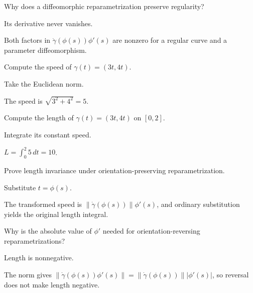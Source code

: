\begin{exercise}\label{exr:vii12-06}
Why does a diffeomorphic reparametrization preserve regularity?
\end{exercise}
\begin{hint}
Its derivative never vanishes.
\end{hint}
\begin{solution}
Both factors in $\dot\gamma(\phi(s))\phi'(s)$ are nonzero for a regular curve and a parameter diffeomorphism.
\end{solution}

\begin{exercise}\label{exr:vii12-07}
Compute the speed of $\gamma(t)=(3t,4t)$.
\end{exercise}
\begin{hint}
Take the Euclidean norm.
\end{hint}
\begin{solution}
The speed is $\sqrt{3^2+4^2}=5$.
\end{solution}

\begin{exercise}\label{exr:vii12-08}
Compute the length of $\gamma(t)=(3t,4t)$ on $[0,2]$.
\end{exercise}
\begin{hint}
Integrate its constant speed.
\end{hint}
\begin{solution}
$L=\int_0^2 5\,dt=10$.
\end{solution}

\begin{exercise}\label{exr:vii12-09}
Prove length invariance under orientation-preserving reparametrization.
\end{exercise}
\begin{hint}
Substitute $t=\phi(s)$.
\end{hint}
\begin{solution}
The transformed speed is $\|\dot\gamma(\phi(s))\|\phi'(s)$, and ordinary substitution yields the original length integral.
\end{solution}

\begin{exercise}\label{exr:vii12-10}
Why is the absolute value of $\phi'$ needed for orientation-reversing reparametrizations?
\end{exercise}
\begin{hint}
Length is nonnegative.
\end{hint}
\begin{solution}
The norm gives $\|\dot\gamma(\phi(s))\phi'(s)\|=\|\dot\gamma(\phi(s))\||\phi'(s)|$, so reversal does not make length negative.
\end{solution}

